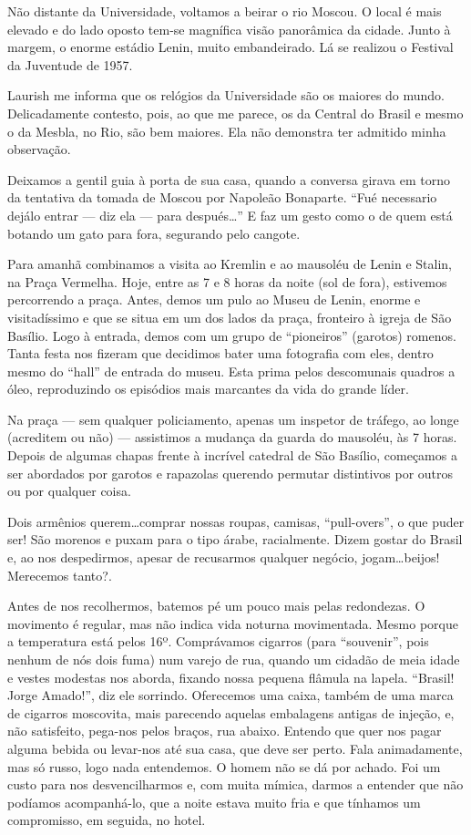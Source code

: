 Não distante da Universidade, voltamos a beirar o rio Moscou. O local é mais elevado e do lado oposto tem-se magnífica visão panorâmica da cidade. Junto à margem, o enorme estádio Lenin, muito embandeirado. Lá se realizou o Festival da Juventude de 1957.

Laurish me informa que os relógios da Universidade são os maiores do mundo. Delicadamente contesto, pois, ao que me parece, os da Central do Brasil e mesmo o da Mesbla, no Rio, são bem maiores. Ela não demonstra ter admitido minha observação.

Deixamos a gentil guia à porta de sua casa, quando a conversa girava em torno da tentativa da tomada de Moscou por Napoleão Bonaparte. ``Fué necessario dejálo entrar --- diz ela --- para después\ldots'' E faz um gesto como o de quem está botando um gato para fora, segurando pelo cangote.

Para amanhã combinamos a visita ao Kremlin e ao mausoléu de Lenin e Stalin, na Praça Vermelha. Hoje, entre as 7 e 8 horas da noite (sol de fora), estivemos percorrendo a praça. Antes, demos um pulo ao Museu de Lenin, enorme e visitadíssimo e que se situa em um dos lados da praça, fronteiro à igreja de São Basílio. Logo à entrada, demos com um grupo de ``pioneiros'' (garotos) romenos. Tanta festa nos fizeram que decidimos bater uma fotografia com eles, dentro mesmo do ``hall'' de entrada do museu. Esta prima pelos descomunais quadros a óleo, reproduzindo os episódios mais marcantes da vida do grande líder.

Na praça --- sem qualquer policiamento, apenas um inspetor de tráfego, ao longe (acreditem ou não) --- assistimos a mudança da guarda do mausoléu, às 7 horas. Depois de algumas chapas frente à incrível catedral de São Basílio, começamos a ser abordados por garotos e rapazolas querendo permutar distintivos por outros ou por qualquer coisa.

Dois armênios querem\ldots comprar nossas roupas, camisas, ``pull-overs'', o que puder ser! São morenos e puxam para o tipo árabe, racialmente. Dizem gostar do Brasil e, ao nos despedirmos, apesar de recusarmos qualquer negócio, jogam\ldots beijos! Merecemos tanto?.

Antes de nos recolhermos, batemos pé um pouco mais pelas redondezas. O movimento é regular, mas não indica vida noturna movimentada. Mesmo porque a temperatura está pelos 16º. Comprávamos cigarros (para ``souvenir'', pois nenhum de nós dois fuma) num varejo de rua, quando um cidadão de meia idade e vestes modestas nos aborda, fixando nossa pequena flâmula na lapela. ``Brasil! Jorge Amado!'', diz ele sorrindo. Oferecemos uma caixa, também de uma marca de cigarros moscovita, mais parecendo aquelas embalagens antigas de injeção, e, não satisfeito, pega-nos pelos braços, rua abaixo. Entendo que quer nos pagar alguma bebida ou levar-nos até sua casa, que deve ser perto. Fala animadamente, mas só russo, logo nada entendemos. O homem não se dá por achado. Foi um custo para nos desvencilharmos e, com muita mímica, darmos a entender que não podíamos acompanhá-lo, que a noite estava muito fria e que tínhamos um compromisso, em seguida, no hotel.

